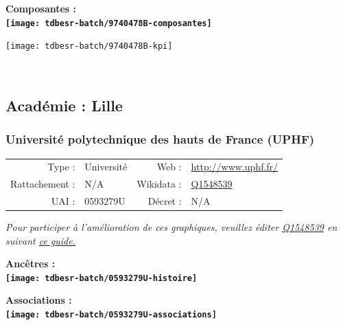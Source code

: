 \documentclass[12pt,french,]{article}
\begin{document}
\hrulefill

\begin{center} \bf Composantes : \\  
\texttt{[image: tdbesr-batch/9740478B-composantes]} \end{center}

\begin{center}\texttt{[image: tdbesr-batch/9740478B-kpi]} \end{center}\checkoddpage

\ifoddpage \fi ~\newpage  

\hypertarget{acaduxe9mie-lille}{%
\subsection{Académie : Lille}\label{acaduxe9mie-lille}}

\hypertarget{universituxe9-polytechnique-des-hauts-de-france-uphf}{%
\subsubsection{Université polytechnique des hauts de France
(UPHF)}\label{universituxe9-polytechnique-des-hauts-de-france-uphf}}

\begin{tabular*}{\textwidth}{rp{5cm}rl}  
\hline  
Type : & Université & Web : &\href{http://www.uphf.fr/}{http://www.uphf.fr/} \\  
Rattachement : & N/A & Wikidata : & \href{https://www.wikidata.org/entity/Q1548539}{Q1548539} \\  
UAI : & 0593279U & Décret : & N/A \\  
\hline  
\end{tabular*}

\textit{\scriptsize Pour participer à l'amélioration de ces graphiques, veuillez éditer  \href{https://www.wikidata.org/entity/Q1548539}{Q1548539}  en suivant \href{https://github.com/cpesr/wikidataESR/blob/master/Rmd/wikidataESR.md}{ce guide.}}

\vspace{1cm}  
\begin{minipage}[b]{0.50\textwidth}\begin{center} \bf Ancêtres : \\  
\texttt{[image: tdbesr-batch/0593279U-histoire]} \end{center}\end{minipage}\begin{minipage}[b]{0.50\textwidth}\begin{center} \bf Associations : \\  
\texttt{[image: tdbesr-batch/0593279U-associations]} \end{center}\end{minipage}
\end{document}
